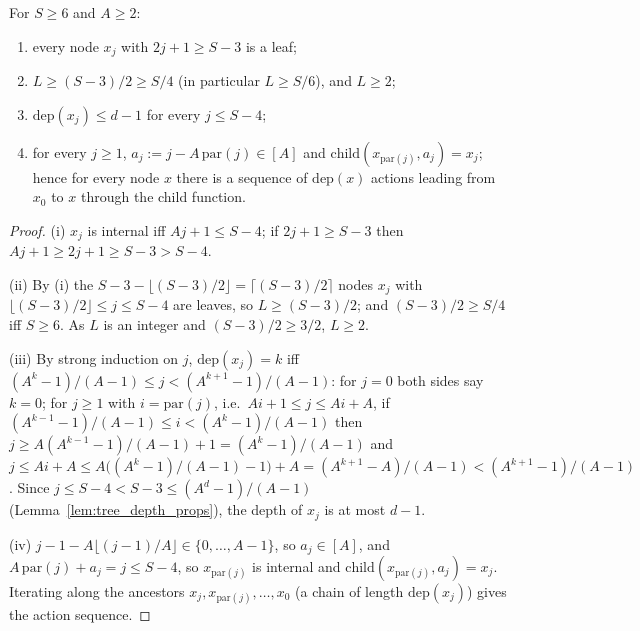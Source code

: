 \begin{lemma}[Leaves]\label{lem:tree_leaves}
\leanok
For $S \ge 6$ and $A \ge 2$:
\begin{enumerate}
  \item[(i)] every node $x_j$ with $2j + 1 \ge S - 3$ is a leaf;
  \item[(ii)] $L \ge (S-3)/2 \ge S/4$ (in particular $L \ge S/6$), and $L \ge 2$;
  \item[(iii)] $\mathrm{dep}(x_j) \le d - 1$ for every $j \le S - 4$;
  \item[(iv)] for every $j \ge 1$, $a_j := j - A\,\mathrm{par}(j) \in [A]$ and
        $\mathrm{child}(x_{\mathrm{par}(j)}, a_j) = x_j$; hence for every node $x$ there is a
        sequence of $\mathrm{dep}(x)$ actions leading from $x_0$ to $x$ through the child function.
\end{enumerate}
\end{lemma}

\begin{proof}
\leanok
{}
(i) $x_j$ is internal iff $Aj + 1 \le S - 4$; if $2j + 1 \ge S - 3$ then
$Aj + 1 \ge 2j + 1 \ge S - 3 > S - 4$.

(ii) By (i) the $S - 3 - \lfloor (S-3)/2 \rfloor = \lceil (S-3)/2 \rceil$ nodes $x_j$ with
$\lfloor (S-3)/2 \rfloor \le j \le S - 4$ are leaves, so $L \ge (S-3)/2$; and $(S-3)/2 \ge S/4$ iff
$S \ge 6$. As $L$ is an integer and $(S-3)/2 \ge 3/2$, $L \ge 2$.

(iii) By strong induction on $j$, $\mathrm{dep}(x_j) = k$ iff
$(A^k - 1)/(A-1) \le j < (A^{k+1}-1)/(A-1)$: for $j = 0$ both sides say $k = 0$; for $j \ge 1$ with
$i = \mathrm{par}(j)$, i.e.\ $Ai + 1 \le j \le Ai + A$, if $(A^{k-1}-1)/(A-1) \le i < (A^k-1)/(A-1)$
then $j \ge A(A^{k-1}-1)/(A-1) + 1 = (A^k - 1)/(A-1)$ and
$j \le A i + A \le A\big((A^k-1)/(A-1) - 1\big) + A = (A^{k+1} - A)/(A-1) < (A^{k+1}-1)/(A-1)$.
Since $j \le S - 4 < S - 3 \le (A^d - 1)/(A-1)$ (Lemma~\ref{lem:tree_depth_props}), the depth of
$x_j$ is at most $d - 1$.

(iv) $j - 1 - A\lfloor (j-1)/A \rfloor \in \{0, \dots, A-1\}$, so $a_j \in [A]$, and
$A\,\mathrm{par}(j) + a_j = j \le S - 4$, so $x_{\mathrm{par}(j)}$ is internal and
$\mathrm{child}(x_{\mathrm{par}(j)}, a_j) = x_j$. Iterating along the ancestors
$x_j, x_{\mathrm{par}(j)}, \dots, x_0$ (a chain of length $\mathrm{dep}(x_j)$) gives the action
sequence.
\end{proof}


